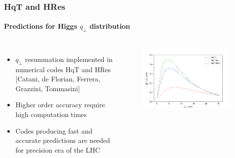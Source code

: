 \documentclass[aspectratio=43]{beamer}
\begin{document}
\begin{frame}


\end{frame}

\begin{frame}

	\frametitle{HqT and HRes}
	\framesubtitle{Predictions for Higgs $q_{\perp}$ distribution}
	
	\begin{columns}
		
			
		\begin{itemize}
			\item $q_{\perp}$ resummation implemented in numerical codes HqT and HRes {\color{blue}[Catani, de Florian, Ferrera, Grazzini, Tommasini]} 
			\item Higher order accuracy require {\color{red}high computation times}
			\item Codes producing fast and accurate predictions are needed for precision era of the LHC
		\end{itemize}

	
		\begin{figure}
			\includegraphics[width = 7 cm]{plots/higgs_qt_all.png}
		\end{figure}		
			
	\end{columns}

\end{frame}
\end{document}
